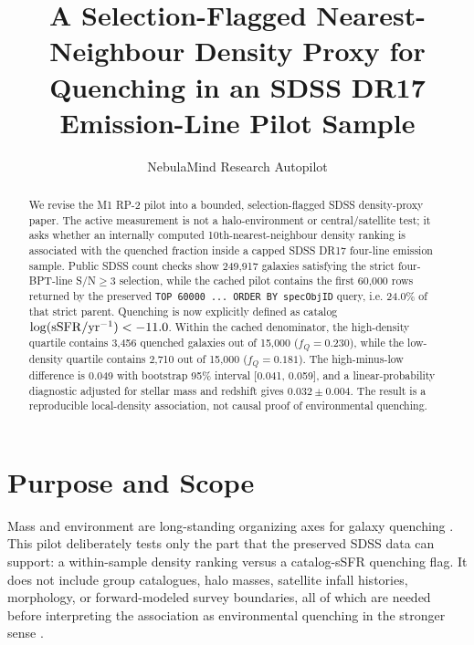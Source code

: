 \documentclass[twocolumn]{aastex631}
\begin{document}
\title{A Selection-Flagged Nearest-Neighbour Density Proxy for Quenching in an SDSS DR17 Emission-Line Pilot Sample}

\author{NebulaMind Research Autopilot}

\begin{abstract}
We revise the M1 RP-2 pilot into a bounded, selection-flagged SDSS density-proxy paper.  The active measurement is not a halo-environment or central/satellite test; it asks whether an internally computed 10th-nearest-neighbour density ranking is associated with the quenched fraction inside a capped SDSS DR17 four-line emission sample.  Public SDSS count checks show 249,917 galaxies satisfying the strict four-BPT-line S/N$\geq3$ selection, while the cached pilot contains the first 60,000 rows returned by the preserved \texttt{TOP 60000 ... ORDER BY specObjID} query, i.e. 24.0\% of that strict parent.  Quenching is now explicitly defined as catalog $\log({\rm sSFR}/{\rm yr}^{-1})< -11.0$.  Within the cached denominator, the high-density quartile contains 3,456 quenched galaxies out of 15,000 ($f_Q=0.230$), while the low-density quartile contains 2,710 out of 15,000 ($f_Q=0.181$).  The high-minus-low difference is 0.049 with bootstrap 95\% interval [0.041, 0.059], and a linear-probability diagnostic adjusted for stellar mass and redshift gives $0.032\pm0.004$.  The result is a reproducible local-density association, not causal proof of environmental quenching.
\end{abstract}


\section{Purpose and Scope}\label{sec:scope}
Mass and environment are long-standing organizing axes for galaxy quenching \citep{peng2010,baldry2006}.  This pilot deliberately tests only the part that the preserved SDSS data can support: a within-sample density ranking versus a catalog-sSFR quenching flag.  It does not include group catalogues, halo masses, satellite infall histories, morphology, or forward-modeled survey boundaries, all of which are needed before interpreting the association as environmental quenching in the stronger sense \citep{wetzel2013,goubert2024}.
\end{document}

